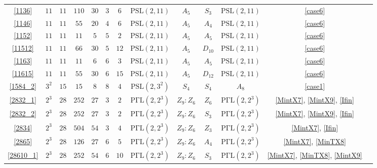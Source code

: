 \documentclass[a4paper,twopage,reqno,12pt]{amsart}
\theoremstyle{definition}
\numberwithin{equation}{section}
\newcommand{\PSL}{\mathrm{PSL}}
\newcommand{\PGaL}{\mathrm{P\Gamma L}}
\begin{document}
\begin{table}
{\begin{tabular}{ccccccccccccc}
 \ref{1136}& $11$ & $11$  & $110$  & $30$  & $3$  & $6$       & $\PSL(2,11)$      &
			$A_{5}$               & $S_{3}$             & $\PSL(2,11)$         & \ref{case6} \\
 \ref{1146}& $11$ & $11$  & $55$   & $20$  & $4$  & $6$       & $\PSL(2,11)$    &  
			$A_{5}$               & $A_{4}$             & $\PSL(2,11)$         & \ref{case6} \\
 \ref{1152}& $11$ & $11$  & $11$   & $5$  & $5$  & $2$       & $\PSL(2,11)$      &
			$A_{5}$               & $A_{5}$            & $\PSL(2,11)$         & \ref{case6} \\
 \ref{11512}& $11$ & $11$  & $66$   & $30$  & $5$  & $12$      & $\PSL(2,11)$     & 
			$A_{5}$               & $D_{10}$            & $\PSL(2,11)$         & \ref{case6} \\
 \ref{1163}& $11$ & $11$  & $11$   & $6$   & $6$  & $3$       & $\PSL(2,11)$      & 
			$A_{5}$               & $A_{5}$             & $\PSL(2,11)$         & \ref{case6} \\
 \ref{11615}& $11$ & $11$  & $55$   & $30$  & $6$  & $15$      & $\PSL(2,11)$     & 
			$A_{5}$               & $D_{12}$            & $\PSL(2,11)$         & \ref{case6} \\
 \ref{1584_2}& $3^2$ & $15$  & $15$   & $8$  & $8$  & $4$      & $\PSL(2,3^2)$             & 
			$S_4$               & $S_4$             & $A_{8}$                & \ref{case1} \\
 \ref{2832_1}& $2 ^3$ & $28$  & $252$  & $27$  & $3$  & $2$       & $\PGaL(2,2^{3}) $  &
			$Z_{9} : Z_{6}$          & $Z_{6}$             & $\PGaL(2,2^{3}) $     & \ref{MintX7}, \ref{MintX9}, \ref{Ifin} \\
 \ref{2832_2}& $2 ^3$ & $28$  & $252$  & $27$  & $3$  & $2$       & $\PGaL(2,2^{3}) $  & 
			$Z_{9} : Z_{6}$          & $S_{3}$             & $\PGaL(2,2^{3}) $     & \ref{MintX7}, \ref{MintX9}, \ref{Ifin}\\
 \ref{2834}& $2 ^3$ & $28$  & $504$  & $54$  & $3$  & $4$       & $\PGaL(2,2^{3}) $  &
			$Z_{9} : Z_{6}$          & $Z_{3}$             & $\PGaL(2,2^{3}) $     & \ref{MintX7}, \ref{Ifin} \\
 \ref{2865}& $2 ^3$ & $28$  & $126$  & $27$  & $6$  & $5$       & $\PGaL(2,2^{3}) $  &
			$Z_{9} : Z_{6}$          & $A_{4}$             & $\PGaL(2,2^{3}) $     & \ref{MintX7}, \ref{MinTX8} \\
 \ref{28610_1}& $2 ^3$ & $28$  & $252$  & $54$  & $6$  & $10$      & $\PGaL(2,2^{3}) $  &
			$Z_{9} : Z_{6}$          & $S_{3}$             & $\PGaL(2,2^{3}) $     & \ref{MintX7}, \ref{MinTX8}, \ref{MintX9} \\

\end{tabular}}
\end{table}
\end{document}
